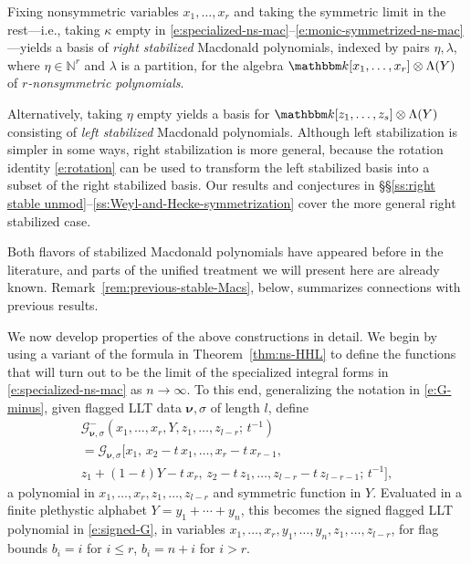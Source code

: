 \documentclass[12pt]{amsart}
\theoremstyle{definition}
\theoremstyle{remark}
\newcommand{\NN}{{\mathbb N}}
\newcommand{\kk}{{\mathbbm k}}
\newcommand{\nubold}{{\boldsymbol \nu }}
\newcommand{\Gcal}{{\mathcal G}}
\begin{document}
Fixing nonsymmetric variables $x_{1},\ldots,x_{r}$ and taking the
symmetric limit in the rest---i.e., taking $\kappa $ empty in
\eqref{e:specialized-ns-mac}--\eqref{e:monic-symmetrized-ns-mac}---yields
a basis of {\em right stabilized} Macdonald polynomials, indexed by
pairs $\eta ,\lambda $, where $\eta \in \NN ^{r}$ and $\lambda $ is a
partition, for the algebra $\kk [x_{1},\ldots,x_{r}]\otimes \Lambda
(Y)$ of {\em $r$-nonsymmetric polynomials}.

Alternatively, taking $\eta $ empty yields a basis for $\kk
[z_{1},\ldots,z_{s}]\otimes \Lambda (Y)$ consisting of {\em left
stabilized} Macdonald polynomials.  Although left stabilization is
simpler in some ways, right stabilization is more general, because the
rotation identity \eqref{e:rotation} can be used to transform the left
stabilized basis into a subset of the right stabilized basis.  Our
results and conjectures in \S \S \ref{ss:right stable
unmod}--\ref{ss:Weyl-and-Hecke-symmetrization} cover the more general
right stabilized case.

Both flavors of stabilized Macdonald polynomials have appeared before
in the literature, and parts of the unified treatment we will present
here are already known.  Remark~\ref{rem:previous-stable-Macs}, below,
summarizes connections with previous results.

We now develop properties of the above constructions in detail.  We
begin by using a variant of the formula in Theorem~\ref{thm:ns-HHL} to
define the functions that will turn out to be the limit of the
specialized integral forms in \eqref{e:specialized-ns-mac} as
$n\rightarrow \infty$. To this end, generalizing the notation in
\eqref{e:G-minus}, given flagged LLT data $\nubold , \sigma $ of
length $l$, define
\begin{multline}\label{e:G-minus-Y}
\Gcal _{\nubold ,\sigma }^{-}(x_{1}, \ldots, x_{r}, Y, z_{1}, \ldots,
z_{l-r};\, t^{-1})\\
 = \Gcal _{\nubold ,\sigma }[x_{1},\, x_{2} - t\, x_{1}, \ldots, x_{r}
- t\, x_{r-1},\\
z_{1} + (1-t)Y -t\, x_{r},\, z_{2} -t\, z_{1}, \ldots, z_{l-r} - t\,
z_{l-r-1};\, t^{-1}],
\end{multline}
a polynomial in $x_{1},\ldots,x_{r},z_{1},\ldots,z_{l-r}$ and
symmetric function in $Y$.  Evaluated in a finite plethystic alphabet
$Y = y_{1}+\cdots +y_{n}$, this becomes the signed flagged LLT
polynomial in \eqref{e:signed-G}, in variables
$x_{1},\ldots,x_{r},y_{1},\ldots,y_{n},z_{1},\ldots,z_{l-r}$, for flag
bounds $b_{i} = i$ for $i\leq r$, $b_{i} = n+i$ for $i>r$.
\end{document}
